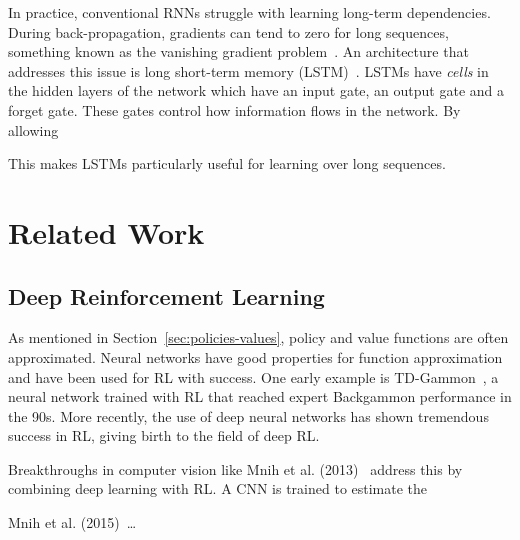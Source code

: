 

In practice, conventional RNNs struggle with learning long-term dependencies.
During back-propagation, gradients can tend to zero for long sequences, something known as the vanishing gradient problem~\cite{goodfellow_deep_2016}.
An architecture that addresses this issue is long short-term memory (LSTM)~\cite{hochreiter_schmidhuber_lstm_1997}.
LSTMs have \textit{cells} in the hidden layers of the network which have an input gate, an output gate and a forget gate.
These gates control how information flows in the network.
By allowing 


This makes LSTMs particularly useful for learning over long sequences.

\section{Related Work}

\subsection{Deep Reinforcement Learning}



As mentioned in Section~\ref{sec:policies-values}, policy and value functions are often approximated.
Neural networks have good properties for function approximation and have been used for RL with success.
One early example is TD-Gammon~\cite{tesauro1995tdgammon}, a neural network trained with RL that reached expert Backgammon performance in the 90s.
More recently, the use of deep neural networks has shown tremendous success in RL, giving birth to the field of deep RL.


\cite{tesauro1995tdgammon} %

\cite{arulkumaran_survey_2017} %




Breakthroughs in computer vision like 
Mnih et al. (2013)~\cite{mnih_atari_2013} address this by combining deep learning with RL.
A CNN is trained to estimate the 

Mnih et al. (2015)~\cite{mnih_human_2015}\dots

